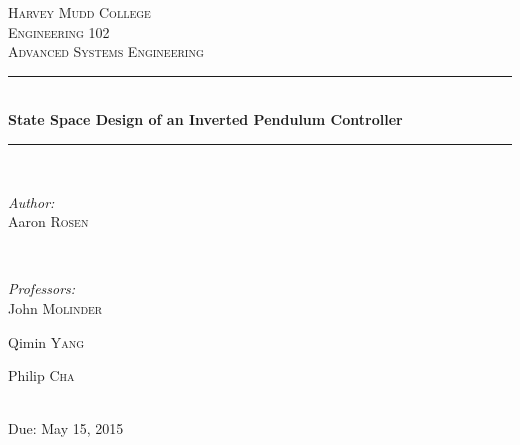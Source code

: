 \documentclass[12pt]{article}
\begin{document}
\begin{titlepage}

\newcommand{\HRule}{\rule{\linewidth}{0.5mm}} %

\center %


\textsc{\LARGE Harvey Mudd College}\\[1.5cm] %
\textsc{\large Engineering 102}\\[0.5cm] %
\textsc{\Large Advanced Systems Engineering}\\[0.5cm]  %

\HRule \\[0.4cm]
{ \huge \bfseries State Space Design of an Inverted Pendulum Controller}\\[0.4cm] %
\HRule \\[1.5cm]
 

\begin{minipage}{0.4\textwidth}
\begin{flushleft} \large
\emph{Author:}\\
Aaron \textsc{Rosen}

\end{flushleft}
\end{minipage}
~
\begin{minipage}{0.4\textwidth}
\begin{flushright} \large
\emph{Professors:} \\
John \textsc{Molinder} %

Qimin \textsc{Yang}

Philip \textsc{Cha}
\end{flushright}
\end{minipage}\\[1cm]



{\large Due: May 15, 2015}\\[1cm] 


\begin{abstract}
\end{abstract}

\vfill %

\end{titlepage}




%
\end{document}
